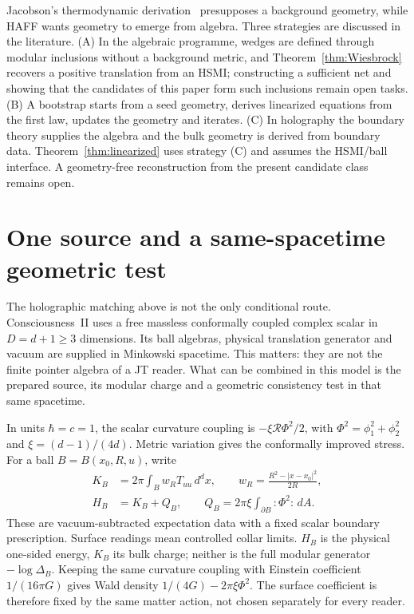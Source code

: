 Jacobson's thermodynamic derivation~\cite{Jacobson1995} presupposes a background geometry, while HAFF wants geometry to emerge from algebra. Three strategies are discussed in the literature. (A) In the algebraic programme, wedges are defined through modular inclusions without a background metric, and Theorem~\ref{thm:Wiesbrock} recovers a positive translation from an HSMI; constructing a sufficient net and showing that the candidates of this paper form such inclusions remain open tasks. (B) A bootstrap starts from a seed geometry, derives linearized equations from the first law, updates the geometry and iterates. (C) In holography the boundary theory supplies the algebra and the bulk geometry is derived from boundary data. Theorem~\ref{thm:linearized} uses strategy (C) and assumes the HSMI/ball interface. A geometry-free reconstruction from the present candidate class remains open.


\section{One source and a same-spacetime geometric test}
\label{sec:common-geometry}

The holographic matching above is not the only conditional route.
Consciousness~II \cite{PaperCII} uses a free massless conformally coupled
complex scalar in $D=d+1\ge3$ dimensions. Its ball algebras, physical
translation generator and vacuum are supplied in Minkowski spacetime.
This matters: they are not the finite pointer algebra of a JT reader.
What can be combined in this model is the prepared source, its modular
charge and a geometric consistency test in that same spacetime.

In units $\hbar=c=1$, the scalar curvature coupling is
$-\xi\mathcal R\Phi^2/2$, with
$\Phi^2=\phi_1^2+\phi_2^2$ and $\xi=(d-1)/(4d)$.
Metric variation gives the conformally improved stress.
For a ball $B=B(x_0,R,u)$, write
\begin{align}
 K_B&=2\pi\int_B w_R T_{uu}\,d^dx,\qquad
 w_R=\frac{R^2-|x-x_0|^2}{2R},\nonumber\\
 H_B&=K_B+Q_B,\qquad
 Q_B=2\pi\xi\int_{\partial B}:\!\Phi^2\!:\,dA .
 \label{eq:common-ball-data}
\end{align}
These are vacuum-subtracted expectation data with a fixed scalar boundary
prescription. Surface readings mean controlled collar limits.
$H_B$ is the physical one-sided energy, $K_B$ its bulk charge;
neither is the full modular generator $-\log\Delta_B$.
Keeping the same curvature coupling with Einstein coefficient
$1/(16\pi G)$ gives Wald density $1/(4G)-2\pi\xi\Phi^2$.
The surface coefficient is therefore fixed by the same matter action,
not chosen separately for every reader.

